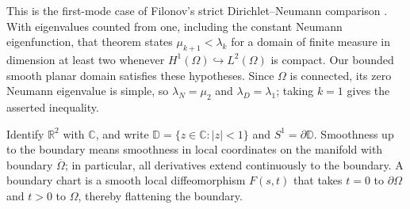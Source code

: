 This is the first-mode case of Filonov's strict Dirichlet--Neumann
comparison \cite[Theorem, p.~414]{Fil05}. With eigenvalues counted from
one, including the constant Neumann eigenfunction, that theorem states
$\mu_{k+1}<\lambda_k$ for a domain of finite measure in dimension at
least two whenever $H^1(\Omega)\hookrightarrow L^2(\Omega)$ is compact.
Our bounded smooth planar domain satisfies these hypotheses. Since
$\Omega$ is connected, its zero Neumann eigenvalue is simple, so
$\lambda_N=\mu_2$ and $\lambda_D=\lambda_1$; taking $k=1$ gives the
asserted inequality.

Identify $\mathbb R^2$ with $\mathbb C$, and write
$\mathbb D=\{z\in\mathbb C:|z|<1\}$ and $S^1=\partial\mathbb D$.
Smoothness up to the boundary means smoothness in local coordinates on
the manifold with boundary $\overline\Omega$; in particular, all derivatives
extend continuously to the boundary. A boundary chart is a smooth local
diffeomorphism $F(s,t)$ that takes $t=0$ to $\partial\Omega$ and $t>0$
to $\Omega$, thereby flattening the boundary.

